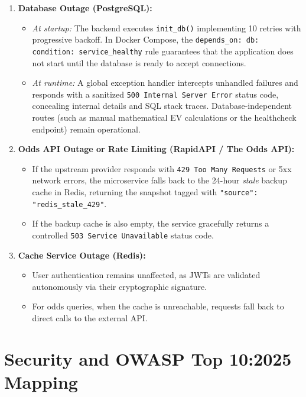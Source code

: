 \documentclass[11pt,a4paper]{article}
\begin{document}
\begin{enumerate}
    \item \textbf{Database Outage (PostgreSQL):}
    \begin{itemize}
        \item \textit{At startup:} The backend executes \texttt{init\_db()} implementing 10 retries with progressive backoff. In Docker Compose, the \texttt{depends\_on: db: condition: service\_healthy} rule guarantees that the application does not start until the database is ready to accept connections.
        \item \textit{At runtime:} A global exception handler intercepts unhandled failures and responds with a sanitized \texttt{500 Internal Server Error} status code, concealing internal details and SQL stack traces. Database-independent routes (such as manual mathematical EV calculations or the healthcheck endpoint) remain operational.
    \end{itemize}
    
    \item \textbf{Odds API Outage or Rate Limiting (RapidAPI / The Odds API):}
    \begin{itemize}
        \item If the upstream provider responds with \texttt{429 Too Many Requests} or 5xx network errors, the microservice falls back to the 24-hour \textit{stale} backup cache in Redis, returning the snapshot tagged with \texttt{"source": "redis\_stale\_429"}.
        \item If the backup cache is also empty, the service gracefully returns a controlled \texttt{503 Service Unavailable} status code.
    \end{itemize}

    \item \textbf{Cache Service Outage (Redis):}
    \begin{itemize}
        \item User authentication remains unaffected, as JWTs are validated autonomously via their cryptographic signature.
        \item For odds queries, when the cache is unreachable, requests fall back to direct calls to the external API.
    \end{itemize}
\end{enumerate}

\section{Security and OWASP Top 10:2025 Mapping}
\end{document}
